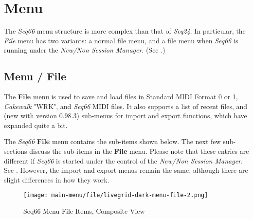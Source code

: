 %
%
%

\section{Menu}
\label{sec:menu}

   The \textsl{Seq66} menu structure is more complex than
   that of \textsl{Seq24}.  In particular, the \textsl{File} menu has two
   variants:  a normal file menu, and a file menu when \textsl{Seq66} is
   running under the \textsl{New/Non Session Manager}.
   (See .)

\subsection{Menu / File}
\label{subsec:menu_file}

   The \textbf{File} menu is used to save and load files in
   Standard MIDI Format 0 or 1, \textsl{Cakewalk} "WRK",
   and \textsl{Seq66} MIDI files.
   It also supports a list of recent files, and (new with version 0.98.3)
   sub-menus for import and export functions, which have expanded quite a bit.

   The \textsl{Seq66} \textbf{File} menu contains the sub-items shown below.
   The next few sub-sections discuss
   the sub-items in the \textbf{File} menu.
   Please note that these entries are different
   if \textsl{Seq66} is started under the control of the
   \textsl{New/Non Session Manager}.  
   See .
   However, the import and export menus remain the same, although there are
   slight differences in how they work.

\begin{figure}[H]
   \centering 
   \texttt{[image: main-menu/file/livegrid-dark-menu-file-2.png]}
   \caption{Seq66 Menu File Items, Composite View}
   \label{fig:menu_file_items}
\end{figure}

